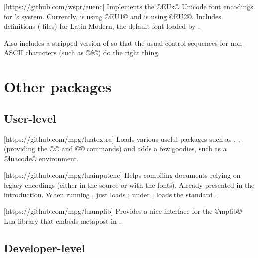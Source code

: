 \documentclass{lltxdoc}
\begin{document}
[https://github.com/wspr/euenc]
Implements the ©EUx© Unicode font encodings for \latex's  system.
Currently, \xelatex is using ©EU1© and \luatex is using ©EU2©. Includes
definitions ( files) for Latin Modern, the default font loaded by
.

Also includes a stripped version of  so that the usual control
sequences for non-ASCII characters (such as ©\'e©) do the right thing.

\section{Other packages}\label{other}

\subsection{User-level}

[https://github.com/mpg/luatextra]
Loads various useful packages such as , ,
 (providing the ©\LuaTeX© and ©\LuaLaTeX© commands) and adds a
few goodies, such as a ©luacode© environment.

[https://github.com/mpg/luainputenc]
Helps compiling documents relying on legacy encodings (either in the source or
with the fonts). Already presented in the introduction. When running \xetex,
just loads ; under \pdftex, loads the standard
.

[https://github.com/mpg/luamplib]
Provides a nice interface for the ©mplib© Lua library that embeds metapost in
\luatex.



\subsection{Developer-level}



\end{document}
